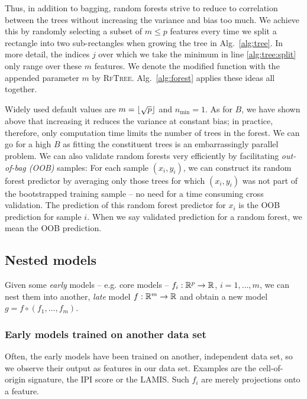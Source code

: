 Thus, in addition to bagging, random forests strive to reduce to correlation between the trees 
without increasing the variance and bias too much. We achieve this by randomly selecting a subset
of $m \leq p$ features every time we split a rectangle into two sub-rectangles when growing the 
tree in Alg.\ \ref{alg:tree}. In more detail, the indices $j$ over which we take the minimum in 
line \ref{alg:tree:split} only range over 
these $m$ features. We denote the modified function with the appended parameter $m$ by 
\textsc{RfTree}. Alg.\ \ref{alg:forest} applies these ideas all together.



Widely used default values are $m = \lfloor\sqrt{p}\rfloor$ and $n_\text{min} = 1$. As for $B$, we have 
shown above that increasing it reduces the variance at constant bias; in practice, therefore, only 
computation time limits the number of trees in the forest. We can go for a high $B$ as fitting the 
constituent trees is an embarrassingly parallel problem. We can 
also validate random forests very efficiently by facilitating \textit{out-of-bag (OOB)} samples: 
For each sample $(x_i, y_i)$, we can construct its random forest predictor by averaging only those 
trees for which $(x_i, y_i)$ was not part of the bootstrapped training sample -- no need for a time 
consuming cross validation. The prediction of this random forest predictor for $x_i$ is the OOB 
prediction for sample $i$. When we say validated prediction for a random forest, we mean the 
OOB prediction.

\subsection{Nested models}\label{subsec:nested-models}

Given some \textit{early} models -- e.g. core models -- $f_i: \mathbb{R}^p \to \mathbb{R}$, $i = 1, \ldots, m$, 
we can nest them into another, \textit{late} model $f: \mathbb{R}^m \to \mathbb{R}$ and obtain a new model 
$g = f \circ (f_1, \ldots, f_m)$. 

\subsubsection{Early models trained on another data set}
Often, the early models have been trained on another, independent data set, so we observe their 
output as features in our data set. Examples are the cell-of-origin signature, the IPI score or the 
LAMIS. Such $f_i$ are merely projections onto a feature.

